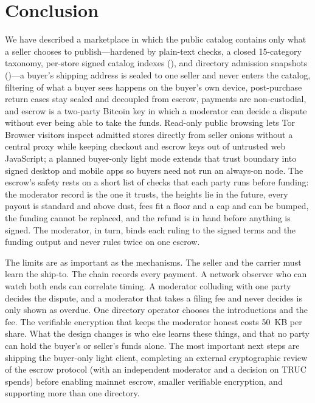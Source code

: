 \section{Conclusion}
\label{sec:conclusion}

We have described a marketplace in which the public catalog contains only what a seller chooses to publish---hardened by plain-text checks, a closed 15-category taxonomy, per-store signed catalog indexes (), and directory admission snapshots ()---a buyer's shipping address is sealed to one seller and never enters the catalog, filtering of what a buyer sees happens on the buyer's own device, post-purchase return cases stay sealed and decoupled from escrow, payments are non-custodial, and escrow is a two-party Bitcoin key in which a moderator can decide a dispute without ever being able to take the funds. Read-only public browsing lets Tor Browser visitors inspect admitted stores directly from seller onions without a central proxy while keeping checkout and escrow keys out of untrusted web JavaScript; a planned buyer-only light mode extends that trust boundary into signed desktop and mobile apps so buyers need not run an always-on node. The escrow's safety rests on a short list of checks that each party runs before funding: the moderator record is the one it trusts, the heights lie in the future, every payout is standard and above dust, fees fit a floor and a cap and can be bumped, the funding cannot be replaced, and the refund is in hand before anything is signed. The moderator, in turn, binds each ruling to the signed terms and the funding output and never rules twice on one escrow.

The limits are as important as the mechanisms. The seller and the carrier must learn the ship-to. The chain records every payment. A network observer who can watch both ends can correlate timing. A moderator colluding with one party decides the dispute, and a moderator that takes a filing fee and never decides is only shown as overdue. One directory operator chooses the introductions and the fee. The verifiable encryption that keeps the moderator honest costs 50~KB per share. What the design changes is who else learns these things, and that no party can hold the buyer's or seller's funds alone. The most important next steps are shipping the buyer-only light client, completing an external cryptographic review of the escrow protocol (with an independent moderator and a decision on TRUC spends) before enabling mainnet escrow, smaller verifiable encryption, and supporting more than one directory.
